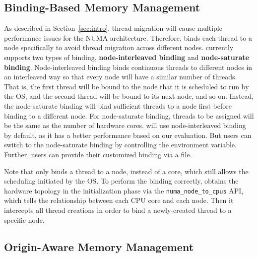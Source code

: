 \subsection{Binding-Based Memory Management} 
\label{sec:balance}
As described in Section~\ref{sec:intro}, thread migration will cause multiple performance issues for the NUMA architecture. Therefore, \NM{} binds each thread to a node specifically to avoid thread migration across different nodes.  \NM{} currently supports two types of binding, \textbf{node-interleaved binding} and \textbf{node-saturate binding}. Node-interleaved binding binds continuous threads to different nodes in an interleaved way so that every node will have a similar number of threads. That is, the first thread will be bound to the node that it is scheduled to run by the OS, and the second thread will be bound to its next node, and so on. Instead, the node-saturate binding will bind sufficient threads to a node first before binding to a different node. For node-saturate binding, threads to be assigned will be the same as the number of hardware cores.  \NM{} will use node-interleaved binding by default, as it has a better performance based on our evaluation. But users can switch to the node-saturate binding by controlling the environment variable. Further, users can provide their customized binding  via a file.

Note that \NM{} only binds a thread to a node, instead of a core, which still allows the scheduling initiated by the OS. To perform the binding correctly, \NM{} obtains the hardware topology in the initialization phase via the \texttt{numa\_node\_to\_cpus} API, which tells the relationship between each CPU core and each 
node. Then it intercepts all thread creations in order to bind a newly-created thread to a specific node.

\subsection{Origin-Aware Memory Management} 
\label{sec:origin}


